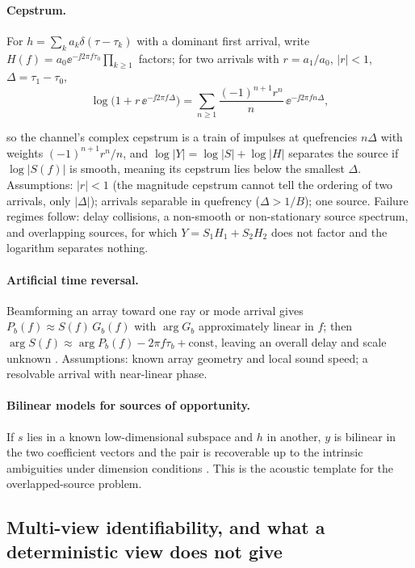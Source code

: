 \paragraph{Cepstrum.} For $h=\sum_k a_k\delta(\tau-\tau_k)$ with a dominant first arrival, write $H(f)=a_0\ee^{-\jj2\pi f\tau_0}\prod_{k\ge1}$ factors; for two arrivals with $r=a_1/a_0$, $|r|<1$, $\Delta=\tau_1-\tau_0$,
\begin{equation}
  \log\big(1+r\,\ee^{-\jj2\pi f\Delta}\big)=\sum_{n\ge1}\frac{(-1)^{n+1}r^n}{n}\,\ee^{-\jj2\pi f n\Delta},
  \label{eq:cepstrum}
\end{equation}
\begin{sloppypar}\noindent so the channel's complex cepstrum is a train of impulses at quefrencies $n\Delta$ with weights $(-1)^{n+1}r^n/n$, and $\log|Y|=\log|S|+\log|H|$ separates the source if $\log|S(f)|$ is smooth, meaning its cepstrum lies below the smallest $\Delta$. Assumptions: $|r|<1$ (the magnitude cepstrum cannot tell the ordering of two arrivals, only $|\Delta|$); arrivals separable in quefrency ($\Delta>1/B$); one source. Failure regimes follow: delay collisions, a non-smooth or non-stationary source spectrum, and overlapping sources, for which $Y=S_1H_1+S_2H_2$ does not factor and the logarithm separates nothing.\end{sloppypar}

\paragraph{Artificial time reversal.} Beamforming an array toward one ray or mode arrival gives $P_b(f)\approx S(f)\,G_b(f)$ with $\arg G_b$ approximately linear in $f$; then $\arg S(f)\approx\arg P_b(f)-2\pi f\tau_b+\text{const}$, leaving an overall delay and scale unknown \citep{sabra2004,sabra2010}. Assumptions: known array geometry and local sound speed; a resolvable arrival with near-linear phase.

\paragraph{Bilinear models for sources of opportunity.} If $s$ lies in a known low-dimensional subspace and $h$ in another, $y$ is bilinear in the two coefficient vectors and the pair is recoverable up to the intrinsic ambiguities under dimension conditions \citep{tian2020,li2017}. This is the acoustic template for the overlapped-source problem.

\subsection{Multi-view identifiability, and what a deterministic view does not give}

